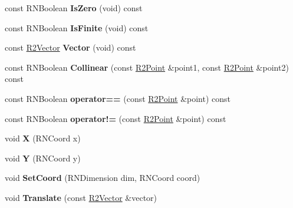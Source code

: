 \begin{DoxyCompactItemize}
\item 
const R\+N\+Boolean {\bfseries Is\+Zero} (void) const \hypertarget{class_r2_point_abbdbacdd2f315ed52b4ed3c005169cb6}{}\label{class_r2_point_abbdbacdd2f315ed52b4ed3c005169cb6}

\item 
const R\+N\+Boolean {\bfseries Is\+Finite} (void) const \hypertarget{class_r2_point_a8d94b8361c6aeb1f3b7139ca6e6f02f6}{}\label{class_r2_point_a8d94b8361c6aeb1f3b7139ca6e6f02f6}

\item 
const \hyperlink{class_r2_vector}{R2\+Vector} {\bfseries Vector} (void) const \hypertarget{class_r2_point_af0a1dea537f7a42b6a7554e38dc8db00}{}\label{class_r2_point_af0a1dea537f7a42b6a7554e38dc8db00}

\item 
const R\+N\+Boolean {\bfseries Collinear} (const \hyperlink{class_r2_point}{R2\+Point} \&point1, const \hyperlink{class_r2_point}{R2\+Point} \&point2) const \hypertarget{class_r2_point_a654c0b0f3b948940d3a422eff2db60bb}{}\label{class_r2_point_a654c0b0f3b948940d3a422eff2db60bb}

\item 
const R\+N\+Boolean {\bfseries operator==} (const \hyperlink{class_r2_point}{R2\+Point} \&point) const \hypertarget{class_r2_point_a6512fec8cd7512a5aa4c282ab1922c19}{}\label{class_r2_point_a6512fec8cd7512a5aa4c282ab1922c19}

\item 
const R\+N\+Boolean {\bfseries operator!=} (const \hyperlink{class_r2_point}{R2\+Point} \&point) const \hypertarget{class_r2_point_adc4e6a5493996eb32b73e06a90c7fc83}{}\label{class_r2_point_adc4e6a5493996eb32b73e06a90c7fc83}

\item 
void {\bfseries X} (R\+N\+Coord x)\hypertarget{class_r2_point_a9184e81eb17db86cd7fec533f25eaeb1}{}\label{class_r2_point_a9184e81eb17db86cd7fec533f25eaeb1}

\item 
void {\bfseries Y} (R\+N\+Coord y)\hypertarget{class_r2_point_ac2c5d65d067a7d6eefd2a0217a5cc6fe}{}\label{class_r2_point_ac2c5d65d067a7d6eefd2a0217a5cc6fe}

\item 
void {\bfseries Set\+Coord} (R\+N\+Dimension dim, R\+N\+Coord coord)\hypertarget{class_r2_point_abfaeb2b7700c03d85c8613048eb5a3c7}{}\label{class_r2_point_abfaeb2b7700c03d85c8613048eb5a3c7}

\item 
void {\bfseries Translate} (const \hyperlink{class_r2_vector}{R2\+Vector} \&vector)\hypertarget{class_r2_point_a04e03e055c4b47d2b6df7308a514aa15}{}\label{class_r2_point_a04e03e055c4b47d2b6df7308a514aa15}


\end{DoxyCompactItemize}
